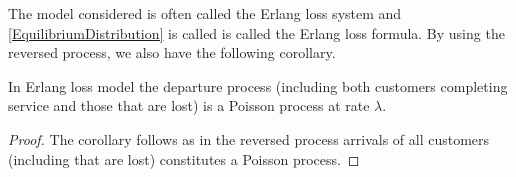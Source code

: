 \documentclass[a4paper,10pt]{article}
\begin{document}
The model considered is often called the Erlang loss system and \ref{EquilibriumDistribution} is called is called the Erlang loss formula. By using the reversed process, we also have the following corollary.
\begin{cor}
In Erlang loss model the departure process (including both customers completing service and those that are lost) is a Poisson process at rate $\lambda$. 
\end{cor}
\begin{proof}
The corollary follows as in the reversed process arrivals of all customers (including that are lost) constitutes a Poisson process. 
\end{proof}
\end{document}
